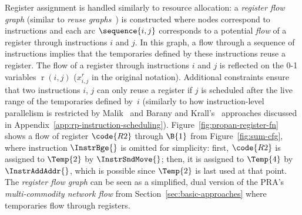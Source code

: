\documentclass[acmsmall,authorversion,nonacm]{acmart}
\newcommand{\noMathVar}[2]{\operatorname{#1}(#2)}
\newcommand{\var}[2]{$\noMathVar{#1}{#2}$}
\begin{document}
Register assignment is handled similarly to resource allocation: a
\emph{register flow graph} (similar to \emph{reuse
  graphs}~\cite{Berson1996,Touati2002}) is constructed where nodes
correspond to instructions and each arc $\sequence{i,j}$ corresponds
to a potential \emph{flow} of a register through instructions $i$ and
$j$.
In this graph, a flow through a sequence of instructions implies that
the temporaries defined by these instructions reuse a register.
The flow of a register through instructions $i$ and $j$ is reflected
on the 0-1 variables \var{r}{i,j} ($x^r_{i,j}$ in the original
notation).
Additional constraints ensure that two instructions $i$, $j$ can only
reuse a register if $j$ is scheduled after the live range of the
temporaries defined by~$i$ (similarly to how instruction-level
parallelism is restricted by Malik~\cite{Malik2008c} and Barany and
Krall's~\cite{Barany2013} approaches discussed in
Appendix~\ref{app:rp-instruction-scheduling}).
Figure~\ref{fig:propan-register-fn} shows a flow of register
$\code{R2}$ through $\B{1}$ from Figure~\ref{fig:sum-cfg}, where
instruction $\InstrBge{}$ is omitted for simplicity: first,
$\code{R2}$ is assigned to $\Temp{2}$ by $\InstrSndMove{}$; then, it
is assigned to $\Temp{4}$ by $\InstrAddAddr{}$, which is possible
since $\Temp{2}$ is last used at that point.
The \emph{register flow graph} can be seen as a simplified, dual
version of the PRA's \emph{multi-commodity network flow} from
Section~\ref{sec:basic-approaches} where temporaries flow through
registers.
\end{document}
